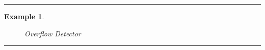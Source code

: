 \documentclass[12pt]{article}
\newtheorem{example}{Example}
\newenvironment{examp}
{\vspace{0.5cm}
\hrule
\begin{example}}
{\hrule
\vspace{0.5cm}
\end{example}}
\begin{document}
\begin{examp}
	\begin{figure}[H]
		\caption{Overflow Detector}
	\end{figure}
\end{examp}
\end{document}
